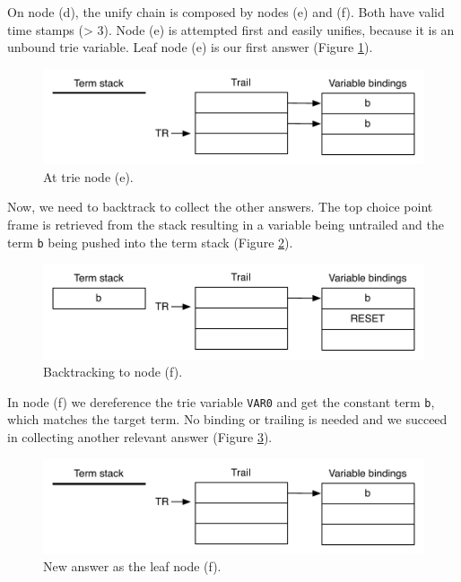 On node (d), the unify chain is composed by nodes (e) and (f). Both have valid time stamps (> 3).
Node (e) is attempted first and easily unifies, because it is an unbound trie variable.
Leaf node (e) is our first answer (Figure \ref{fig:collect_ex3}).

\begin{figure}[H]
  \centering
    \includegraphics[scale=0.6]{collect_ex3.pdf}
  \caption{At trie node (e).}
  \label{fig:collect_ex3}
\end{figure}

Now, we need to backtrack to collect the other answers. The top choice point frame is retrieved from the stack resulting in a variable being untrailed and the term \texttt{b} being pushed into the term stack (Figure \ref{fig:collect_ex4}).

\begin{figure}[H]
  \centering
    \includegraphics[scale=0.6]{collect_ex4.pdf}
  \caption{Backtracking to node (f).}
  \label{fig:collect_ex4}
\end{figure}

In node (f) we dereference the trie variable \texttt{VAR0} and get the constant term \texttt{b}, which matches the target term. No binding or trailing is needed and we succeed in collecting another relevant answer (Figure \ref{fig:collect_ex5}).

\begin{figure}[H]
  \centering
    \includegraphics[scale=0.6]{collect_ex5.pdf}
  \caption{New answer as the leaf node (f).}
  \label{fig:collect_ex5}
\end{figure}

